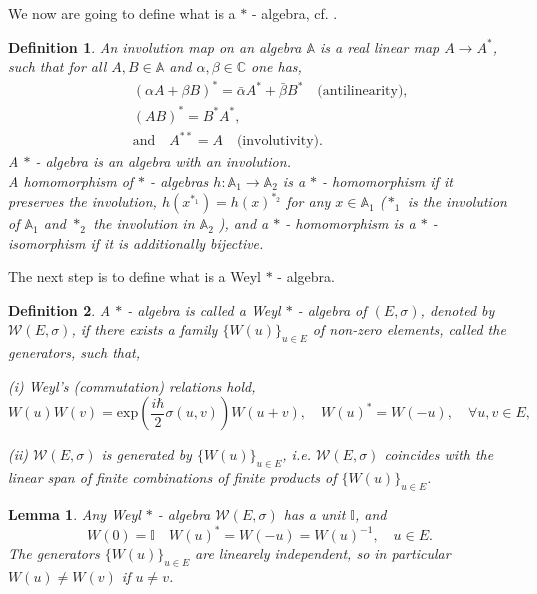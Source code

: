 \documentclass[10pt]{article} %
\numberwithin{equation}{section}
\numberwithin{equation}{section} %
\numberwithin{figure}{section} %
\newcommand{\E}[1]{\text{exp}\left({#1}\right)} %
\theoremstyle{theoremsf}
\newtheorem{lem}[thm]{Lemma}
\theoremstyle{definitionsf}
\newtheorem{dfn}{Definition}[section]
\begin{document}
\noindent
We now are going to define what is a $\ast$ - algebra, cf. \cite[definition 2.1.9]{Landsman1998}.

\begin{dfn} \label{invo}
 An involution map on an algebra $\mathbb{A}$ \cite{weisAlgebra} is a real linear map $ A \to A^\ast $, such that for all $A, B \in \mathbb{A}$ and $\alpha, \beta \in \mathbb{C}$ one has,
 \begin{eqnarray}
  && (\alpha A + \beta B)^\ast = \bar{\alpha} A^\ast + \bar{\beta} B^\ast \quad \text{(antilinearity)}, \\
  && (AB)^{\ast} = B^{\ast} A^{\ast}, \\
  && \text{and} \quad  A^{\ast \ast} = A \quad \text{(involutivity)}.
 \end{eqnarray}
 A $\ast$ - algebra is an algebra with an involution. \\
 A homomorphism of $\ast$ - algebras $h : \mathbb{A}_1 \to \mathbb{A}_2$ is a $\ast$ - homomorphism if it preserves the involution, $h(x^{\ast_{1}}) = h(x)^{\ast_{2}}$ for any $x \in \mathbb{A}_1$ ($\ast_1$ is the involution of $\mathbb{A}_1$ and $\ast_2$ the involution in $\mathbb{A}_2$ ), and a $\ast$ - homomorphism is a $\ast$ - isomorphism if it is additionally bijective.
\end{dfn}

\noindent
The next step is to define what is a Weyl $\ast$ - algebra.

\begin{dfn} \label{WeylStar}
 A $\ast$ - algebra is called a Weyl $\ast$ - algebra of $(E,\sigma)$, denoted by $\mathcal{W}(E,\sigma)$, if there exists a family $\big\{ W(u) \big\}_{u \in E}$ of non-zero elements, called the generators, such that,
 \begin{description}
  \item (i) \quad Weyl's (commutation) relations hold, 
  \begin{equation} 
   W(u) W(v) = \E{ \frac{i\hbar}{2} \sigma(u,v) } W(u+v), \quad W(u)^\ast = W(-u), \quad \forall u,v \in E, 
  \end{equation}
  \item (ii) \quad $\mathcal{W}(E,\sigma)$ is generated by $\big\{ W(u) \big\}_{u \in E}$, i.e. $\mathcal{W}(E,\sigma)$ coincides with the linear span of finite combinations of finite products of $\big\{ W(u) \big\}_{u \in E}$.
 \end{description} 
\end{dfn}

\begin{lem}
 Any Weyl $\ast$ - algebra $\mathcal{W}(E,\sigma)$ has a unit $\mathbb{I}$, and
 \begin{equation}
  W(0) = \mathbb{I} \quad W(u)^\ast = W(-u) = W(u)^{-1}, \quad u \in E.
 \end{equation}
 The generators $\big\{ W(u) \big\}_{u \in E}$ are linearely independent, so in particular $W(u) \neq W(v)$ if $u \neq v$.
\end{lem}
\end{document}
